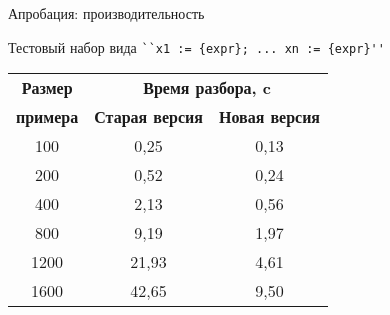 \documentclass[10pt, mathserif]{beamer}
\let\\\tabularnewline
\let\\\tabularnewline
\theoremstyle{definition}
\begin{document}
\begin{frame}[fragile]{Апробация: производительность}

Тестовый набор вида \lstinline|``x1 := {expr}; ... xn := {expr}''|
\vskip3mm

  \begin{table}[htbp]
  \begin{center}
  \begin{tabular}{|c|c|c|}
  \hline
  \textbf{Размер} & \multicolumn{2}{|c|}{\textbf{Время разбора, c}} \\
  \cline{2-3}
  \textbf{примера} & \textbf{Старая версия} & \textbf{Новая версия} \\
  \hline
  100& 0,25& 0,13 \\
  \hline
  200& 0,52& 0,24 \\
  \hline
  400& 2,13& 0,56 \\
  \hline
  800& 9,19& 1,97 \\
  \hline
  1200& 21,93& 4,61 \\
  \hline
  1600& 42,65& 9,50 \\
  \hline
  \end{tabular}
  \vskip3mm
  \label{tab1}
  \end{center}\vspace{-10mm}
  \end{table}

\end{frame}
\end{document}
